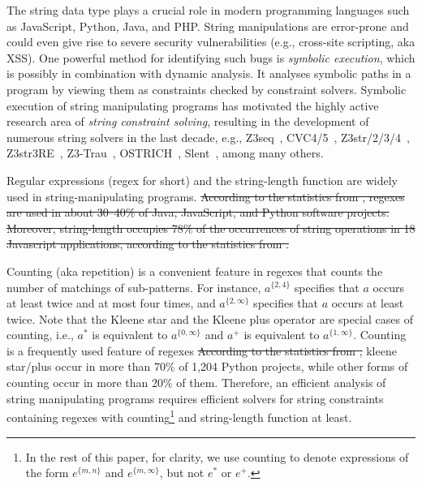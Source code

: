 The string data type plays a crucial role in modern programming languages such as JavaScript, Python, Java, and PHP. 
String manipulations are error-prone and could even give rise to severe security vulnerabilities (e.g., cross-site scripting, aka XSS). 
One powerful method for identifying such bugs is \emph{symbolic execution}, which is possibly in combination with dynamic analysis. It analyses symbolic paths in a program by viewing them as constraints checked by constraint solvers. 
%
Symbolic execution of string manipulating programs has motivated the highly active research area of \emph{string constraint solving}, resulting in the development of numerous string solvers in the last decade, e.g.,
Z3seq~\cite{z3seq}, CVC4/5~\cite{cvc4,cvc5}, Z3str/2/3/4~\cite{Z3-str,Z3-str2,Z3-str3,BerzishMurphy2021}, Z3str3RE~\cite{BD+23}, 
Z3-Trau~\cite{Z3-trau}\cite{z3trau}, OSTRICH~\cite{CHL+19}, Slent~\cite{WC+18}, among many others. 

Regular expressions (regex for short) and the string-length function are widely used in string-manipulating programs. \sout{According to the statistics from \cite{CS16,DCSL18,WS18}, regexes are used in about 30–40\% of Java, JavaScript, and Python software projects. Moreover, string-length occupies 78\% of the occurrences of string operations in 18 Javascript applications, according to the statistics from \cite{malware_detection_3_kudzu}.}  

Counting (aka repetition) is a convenient feature in regexes that counts the number of matchings of sub-patterns. For instance, $a^{\{2, 4\}}$ specifies that $a$ occurs at least twice and at most four times, and $a^{\{2, \infty\}}$ specifies that $a$ occurs at least twice. 
Note that the Kleene star and the Kleene plus operator are special cases of counting, i.e., $a^*$ is equivalent to $a^{\{0,\infty\}}$ and $a^+$ is equivalent to $a^{\{1,\infty\}}$.
Counting is a frequently used feature of regexes \hdh{:}\sout{According to the statistics from \cite{CS16},} kleene star/plus occur in more than 70\% of 1,204 Python projects, while other forms of counting occur in more than 20\% of them. Therefore, an efficient analysis of string manipulating programs requires efficient solvers for string constraints containing regexes with counting\footnote{In the rest of this paper, for clarity, we use counting to denote expressions of the form $e^{\{m, n\}}$ and  $e^{\{m, \infty\}}$, but not $e^*$ or $e^+$.} and string-length function at least. 

